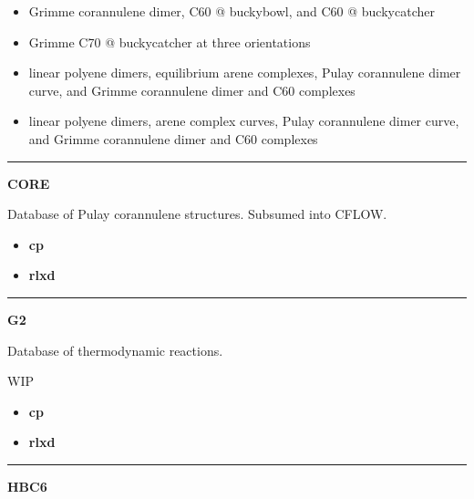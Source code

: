 \documentclass[letterpaper,10pt,english]{sphinxmanual}
\begin{document}
\begin{itemize}
\begin{itemize}
\item {} 
 Grimme corannulene dimer, C60 @ buckybowl, and C60 @ buckycatcher

\item {} 
 Grimme C70 @ buckycatcher at three orientations

\item {} 
 linear polyene dimers, equilibrium arene complexes, Pulay corannulene dimer curve, and Grimme corannulene dimer and C60 complexes

\item {} 
 linear polyene dimers, arene complex curves, Pulay corannulene dimer curve, and Grimme corannulene dimer and C60 complexes

\end{itemize}

\end{itemize}


\bigskip\hrule{}\bigskip

\label{index:module-CORE}
\textbf{CORE}

Database of Pulay corannulene structures. Subsumed into CFLOW.
\begin{itemize}
\item {} 
\textbf{cp}   \textbar{}\textbar{} 

\item {} 
\textbf{rlxd} 

\end{itemize}


\bigskip\hrule{}\bigskip

\label{index:module-G2}
\textbf{G2}

\begin{DUlineblock}{0em}
\item[] Database of thermodynamic reactions.
\item[] WIP
\end{DUlineblock}
\begin{itemize}
\item {} 
\textbf{cp}  

\item {} 
\textbf{rlxd} 

\end{itemize}


\bigskip\hrule{}\bigskip

\label{index:module-HBC6}
\textbf{HBC6}
\end{document}

